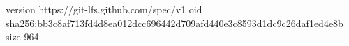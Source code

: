 version https://git-lfs.github.com/spec/v1
oid sha256:bb3c8af713fd4d8ea012dcc696442d709afd440e3c8593d1dc9c26daf1ed4e8b
size 964
